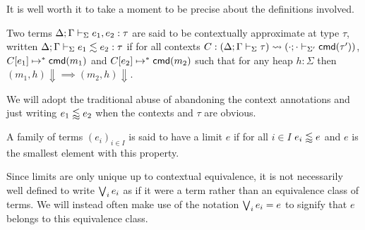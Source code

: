 It is well worth it to take a moment to be precise about the
definitions involved.
\begin{defn}\label{def:smi:contextual-approximation}
  Two terms $\Delta; \Gamma \vdash_{\Sigma} e_1, e_2 \mathrel{:} \tau$ are
  said to be contextually approximate at type $\tau$, written
  $\Delta; \Gamma \vdash_{\Sigma} e_1 \lesssim e_2 \mathrel{:} \tau$ if for all
  contexts
  $C : (\Delta; \Gamma \vdash_{\Sigma} \tau) \rightsquigarrow (\cdot; \cdot \vdash_{\Sigma'} \mathsf{cmd}(\tau'))$,
  $C[e_1] \mapsto^* \mathsf{cmd}(m_1)$ and $C[e_2] \mapsto^* \mathsf{cmd}(m_2)$ such
  that for any heap $h : \Sigma$ then
  $(m_1, h) \Downarrow \implies (m_2, h) \Downarrow$.
\end{defn}
We will adopt the traditional abuse of abandoning the context
annotations and just writing $e_1 \lessapprox e_2$ when the contexts and
$\tau$ are obvious.
\begin{defn}\label{def:smi:contextual-limits}
  A family of terms $(e_i)_{i \in I}$ is said to have a limit $e$ if
  for all $i \in I$ $e_i \lessapprox e$ and $e$ is the smallest element
  with this property.
\end{defn}
Since limits are only unique up to contextual equivalence, it is not
necessarily well defined to write $\bigvee_i e_i$ as if it were a term
rather than an equivalence class of terms. We will instead often make
use of the notation $\bigvee_i e_i = e$ to signify that $e$ belongs to
this equivalence class.

